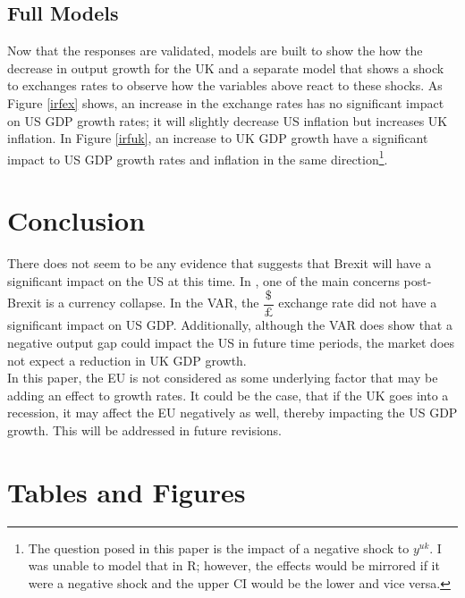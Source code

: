 \documentclass[12pt]{article}
\begin{document}
\subsection{Full Models}
Now that the responses are validated, models are built to show the how the decrease in output growth for the UK and a separate model that shows a shock to exchanges rates to observe how the variables above react to these shocks. As Figure \ref{irfex} shows, an increase in the exchange rates has no significant impact on US GDP growth rates; it will slightly decrease US inflation but increases UK inflation. In Figure \ref{irfuk}, an increase to UK GDP growth have a significant impact to US GDP growth rates and inflation in the same direction\footnote{The question posed in this paper is the impact of a negative shock to $y^{uk}$. I was unable to model that in R; however, the effects would be mirrored if it were a negative shock and the upper CI would be the lower and vice versa.}.\\

\section{Conclusion}
There does not seem to be any evidence that suggests that Brexit will have a significant impact on the US at this time. In \citet{corsmuel:2016}, one of the main concerns post-Brexit is a currency collapse. In the VAR, the $\dfrac{\$}{\pounds}$ exchange rate did not have a significant impact on US GDP. Additionally, although the VAR does show that a negative output gap could impact the US in future time periods, the market does not expect a reduction in UK GDP growth.\\

In this paper, the EU is not considered as some underlying factor that may be adding an effect to growth rates. It could be the case, that if the UK goes into a recession, it may affect the EU negatively as well, thereby impacting the US GDP growth. This will be addressed in future revisions.
\newpage
\section*{Tables and Figures}
\end{document}
